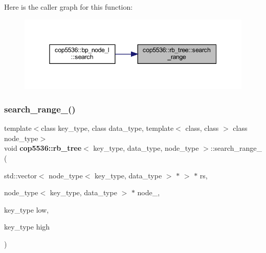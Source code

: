 Here is the caller graph for this function\+:
\nopagebreak
\begin{figure}[H]
\begin{center}
\leavevmode
\includegraphics[width=345pt]{classcop5536_1_1rb__tree_a222eb0ee0c9d1e02efd9192edb04a990_icgraph}
\end{center}
\end{figure}
\mbox{\label{classcop5536_1_1rb__tree_adf90297cb8bb2624c4fa7dc389d51036}} 
\subsubsection{search\_range\_()}
{\footnotesize\ttfamily template$<$class key\+\_\+type, class data\+\_\+type, template$<$ class, class $>$ class node\+\_\+type$>$ \\
void \textbf{ cop5536\+::rb\+\_\+tree}$<$ key\+\_\+type, data\+\_\+type, node\+\_\+type $>$\+::search\+\_\+range\+\_\+ (\begin{DoxyParamCaption}\item[{std\+::vector$<$ node\+\_\+type$<$ key\+\_\+type, data\+\_\+type $>$ $\ast$ $>$ $\ast$}]{rs,  }\item[{node\+\_\+type$<$ key\+\_\+type, data\+\_\+type $>$ $\ast$}]{node\+\_\+,  }\item[{key\+\_\+type}]{low,  }\item[{key\+\_\+type}]{high }\end{DoxyParamCaption})\hspace{0.3cm}{\ttfamily [inline]}}

\mbox{\label{classcop5536_1_1rb__tree_a4666680e02d989b1e8fab52f92f7bfb8}} 
